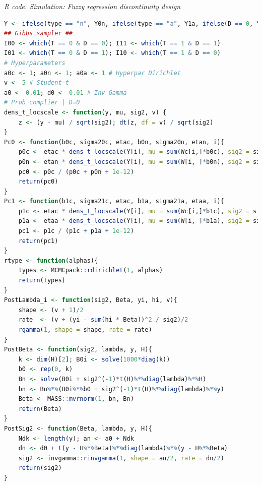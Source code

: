 \begin{tcolorbox}[enhanced,width=4.67in,center upper,
	fontupper=\large\bfseries,drop shadow southwest,sharp corners]
	\textit{R code. Simulation: Fuzzy regression discontinuity design}
	\begin{VF}
		\begin{lstlisting}[language=R]	
Y <- ifelse(type == "n", Y0n, ifelse(type == "a", Y1a, ifelse(D == 0, Y0c, Y1c)))
## Gibbs sampler ##
I00 <- which(T == 0 & D == 0); I11 <- which(T == 1 & D == 1)
I01 <- which(T == 0 & D == 1); I10 <- which(T == 1 & D == 0)
# Hyperparameters
a0c <- 1; a0n <- 1; a0a <- 1 # Hyperpar Dirichlet
v <- 5 # Student-t
a0 <- 0.01; d0 <- 0.01 # Inv-Gamma
# Prob complier | D=0
dens_t_locscale <- function(y, mu, sig2, v) {
	z <- (y - mu) / sqrt(sig2); dt(z, df = v) / sqrt(sig2)
}
Pc0 <- function(b0c, sigma20c, etac, b0n, sigma20n, etan, i){
	p0c <- etac * dens_t_locscale(Y[i], mu = sum(Wc[i,]*b0c), sig2 = sigma20c, v = v)
	p0n <- etan * dens_t_locscale(Y[i], mu = sum(W[i, ]*b0n), sig2 = sigma20n, v = v)
	pc0 <- p0c / (p0c + p0n + 1e-12)
	return(pc0)
}
Pc1 <- function(b1c, sigma21c, etac, b1a, sigma21a, etaa, i){
	p1c <- etac * dens_t_locscale(Y[i], mu = sum(Wc[i,]*b1c), sig2 = sigma21c, v = v)
	p1a <- etaa * dens_t_locscale(Y[i], mu = sum(W[i, ]*b1a), sig2 = sigma21a, v = v)
	pc1 <- p1c / (p1c + p1a + 1e-12)
	return(pc1)
}
rtype <- function(alphas){
	types <- MCMCpack::rdirichlet(1, alphas)
	return(types)
}
PostLambda_i <- function(sig2, Beta, yi, hi, v){
	shape <- (v + 1)/2
	rate  <- (v + (yi - sum(hi * Beta))^2 / sig2)/2
	rgamma(1, shape = shape, rate = rate)
}
PostBeta <- function(sig2, lambda, y, H){
	k <- dim(H)[2]; B0i <- solve(1000*diag(k))
	b0 <- rep(0, k)
	Bn <- solve(B0i + sig2^(-1)*t(H)%*%diag(lambda)%*%H)
	bn <- Bn%*%(B0i%*%b0 + sig2^(-1)*t(H)%*%diag(lambda)%*%y)
	Beta <- MASS::mvrnorm(1, bn, Bn)
	return(Beta)
}
PostSig2 <- function(Beta, lambda, y, H){
	Ndk <- length(y); an <- a0 + Ndk 
	dn <- d0 + t(y - H%*%Beta)%*%diag(lambda)%*%(y - H%*%Beta)
	sig2 <- invgamma::rinvgamma(1, shape = an/2, rate = dn/2)
	return(sig2)
}
\end{lstlisting}
	\end{VF}
\end{tcolorbox}  

